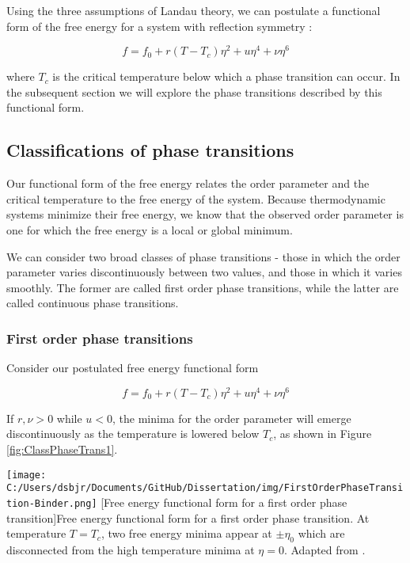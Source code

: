 Using the three assumptions of Landau theory, we can postulate a functional form of the free energy for a system with reflection symmetry \cite{Binder1987}:

\begin{equation}
f = f_{0} + r(T-T_{c}) \eta^{2} + u \eta^{4} + \nu \eta^{6}
\end{equation}

where $T_{c}$ is the critical temperature below which a phase transition can occur. In the subsequent section we will explore the phase transitions described by this functional form.

\subsection{Classifications of phase transitions}

Our functional form of the free energy relates the order parameter and the critical temperature to the free energy of the system. Because thermodynamic systems minimize their free energy, we know that the observed order parameter is one for which the free energy is a local or global minimum.

We can consider two broad classes of phase transitions - those in which the order parameter varies discontinuously between two values, and those in which it varies smoothly. The former are called first order phase transitions, while the latter are called continuous phase transitions.

\subsubsection{First order phase transitions}

Consider our postulated free energy functional form

\begin{equation}
f = f_{0} + r(T-T_{c}) \eta^{2} + u \eta^{4} + \nu \eta^{6}
\end{equation}

If $r,\nu > 0$ while $u < 0$, the minima for the order parameter will emerge discontinuously as the temperature is lowered below $T_{c}$, as shown in Figure \ref{fig:ClassPhaseTrans1}.

\begin{centering}
\texttt{[image: C:/Users/dsbjr/Documents/GitHub/Dissertation/img/FirstOrderPhaseTransition-Binder.png]}
  \captionsetup{width=0.9\textwidth}
  [Free energy functional form for a first order phase transition]{Free energy functional form for a first order phase transition. At temperature  $T = T_{c}$, two free energy minima appear at $\pm \eta_{0}$ which are disconnected from the high temperature minima at $\eta = 0$.  Adapted from \cite{Binder1987}.}
  \label{fig:ClassPhaseTrans1}
\end{centering}

